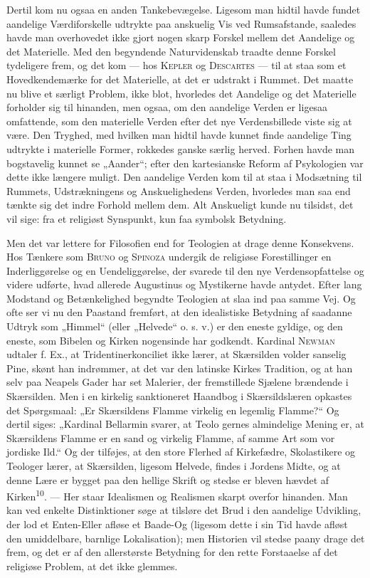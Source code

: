 \documentclass[12pt,a4paper,openany]{book}
\newcommand{\opage}[1]{\marginnote{\footnotesize\textit{[#1]}}}
\begin{document}
Dertil kom nu ogsaa en anden Tankebevægelse. Ligesom man hidtil havde
fundet aandelige Værdiforskelle udtrykte paa anskuelig Vis ved
Rumsafstande, saaledes havde man overhovedet ikke gjort nogen skarp
Forskel mellem det Aandelige og det Materielle. Med den begyndende
Naturvidenskab traadte denne Forskel tydeligere frem, og det kom --- hos
\textsc{Kepler} og \textsc{Descartes} --- til at staa som et
Hovedkendemærke for det Materielle, at det er udstrakt i Rummet. Det
maatte nu blive et særligt Problem, ikke blot, hvorledes det Aandelige
og det Materielle forholder sig til hinanden, men ogsaa, om den
aandelige Verden er ligesaa omfattende, som den materielle Verden efter
det nye Verdensbillede viste sig at være. Den Tryghed, med hvilken man
hidtil havde kunnet finde aandelige Ting udtrykte i materielle Former,
rokkedes ganske særlig herved. Forhen havde man bogstavelig kunnet se
„Aander“; efter den kartesianske Reform af Psykologien var dette ikke
længere muligt. Den aandelige Verden kom til at staa i Modsætning til
Rummets, Udstrækningens og Anskuelighedens Verden, hvorledes man saa end
tænkte sig det indre Forhold mellem dem. Alt Anskueligt kunde nu
tilsidst, det vil sige: fra et religiøst Synspunkt, kun faa symbolsk
Betydning.

Men det var lettere for Filosofien end for Teologien at drage denne
Konsekvens. Hos Tænkere som \textsc{Bruno} og \textsc{Spinoza} undergik
de religiøse Forestillinger en Inderliggørelse og en Uendeliggørelse,
der svarede til den nye Verdensopfattelse og videre udførte, hvad
allerede Augustinus og Mystikerne havde antydet. Efter lang Modstand og
Betænkelighed begyndte Teologien at slaa ind paa samme Vej. Og ofte ser
vi nu den Paastand fremført, at den idealistiske Betydning af saadanne
Udtryk som „Himmel“ (eller „Helvede“ o. s. v.) er den eneste gyldige, og
den eneste, som Bibelen og Kirken nogensinde har godkendt. Kardinal
\textsc{Newman} udtaler f. Ex., at Tridentinerkonciliet ikke lærer, at
Skærsilden volder sanselig Pine, skønt han indrømmer, at det var den
latinske Kirkes Tradition, og at han selv paa Neapels Gader har set
Malerier, der fremstillede Sjælene brændende i Skærsilden. Men i en
kirkelig sanktioneret Haandbog i Skærsildslæren opkastes det Spørgsmaal:
„Er Skærsildens Flamme virkelig en legemlig Flamme?“ Og dertil siges:
„Kardinal Bellarmin svarer, at Teolo%
\opage{30}gernes almindelige Mening er, at Skærsildens Flamme er en sand
og virkelig Flamme, af samme Art som vor jordiske Ild.“ Og der tilføjes,
at den store Flerhed af Kirkefædre, Skolastikere og Teologer lærer, at
Skærsilden, ligesom Helvede, findes i Jordens Midte, og at denne Lære er
bygget paa den hellige Skrift og stedse er bleven hævdet af
Kirken\textsuperscript{10}. --- Her staar Idealismen og Realismen skarpt
overfor hinanden. Man kan ved enkelte Distinktioner søge at tilsløre det
Brud i den aandelige Udvikling, der lod et Enten-Eller afløse et
Baade-Og (ligesom dette i sin Tid havde afløst den umiddelbare, barnlige
Lokalisation); men Historien vil stedse paany drage det frem, og det er
af den allerstørste Betydning for den rette Forstaaelse af det religiøse
Problem, at det ikke glemmes.
\end{document}
